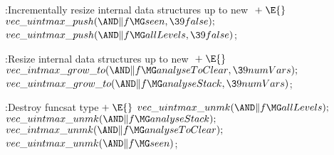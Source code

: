 \Y\B\4:Incrementally resize internal data structures up to new \X${}\mathrel+\E{}$\6
$\\{vec\_uintmax\_push}({\AND}\|f\MG\\{seen},\39\\{false});{}$\6
${}\\{vec\_uintmax\_push}({\AND}\|f\MG\\{allLevels},\39\\{false}){}$;\par
\fi

\Y\B\4:Resize internal data structures up to new \X${}%
\mathrel+\E{}$\6
$\\{vec\_intmax\_grow\_to}({\AND}\|f\MG\\{analyseToClear},\39\\{numVars});{}$\6
${}\\{vec\_uintmax\_grow\_to}({\AND}\|f\MG\\{analyseStack},\39\\{numVars}){}$;%
\par
\fi

\Y\B\4:Destroy funcsat type\X${}\mathrel+\E{}$\6
$\\{vec\_uintmax\_unmk}({\AND}\|f\MG\\{allLevels});{}$\6
${}\\{vec\_uintmax\_unmk}({\AND}\|f\MG\\{analyseStack});{}$\6
${}\\{vec\_intmax\_unmk}({\AND}\|f\MG\\{analyseToClear});{}$\6
${}\\{vec\_uintmax\_unmk}({\AND}\|f\MG\\{seen}){}$;\par
\fi


